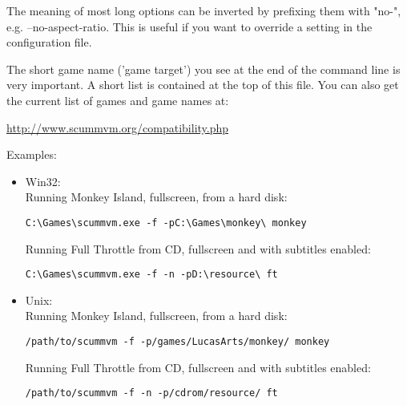 The meaning of most long options can be inverted by prefixing them with "no-",
e.g. --no-aspect-ratio. This is useful if you want to override a setting in the
configuration file.

The short game name ('game target') you see at the end of the command
line is very important. A short list is contained at the top of this
file. You can also get the current list of games and game names at:

\begin{center}
  \url{http://www.scummvm.org/compatibility.php}
\end{center}

Examples:
\begin{itemize}
\item Win32:\\
Running Monkey Island, fullscreen, from a hard disk:
\begin{verbatim}
C:\Games\scummvm.exe -f -pC:\Games\monkey\ monkey
\end{verbatim}
  Running Full Throttle from CD, fullscreen and with subtitles enabled:
\begin{verbatim}
C:\Games\scummvm.exe -f -n -pD:\resource\ ft
\end{verbatim}
 \item Unix:\\
  Running Monkey Island, fullscreen, from a hard disk:
\begin{verbatim}
/path/to/scummvm -f -p/games/LucasArts/monkey/ monkey
\end{verbatim}
  Running Full Throttle from CD, fullscreen and with subtitles enabled:
\begin{verbatim}
/path/to/scummvm -f -n -p/cdrom/resource/ ft
\end{verbatim}
\end{itemize}
